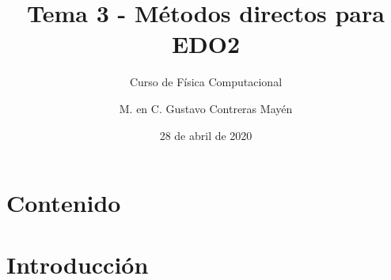
\title{Tema 3 - Métodos directos para EDO2}
\subtitle{Curso de Física Computacional}
\author[]{M. en C. Gustavo Contreras Mayén}
\date{28 de abril de 2020}

\maketitle
\fontsize{14}{14}\selectfont
{}
\section*{Contenido}
\section{Introducción}
